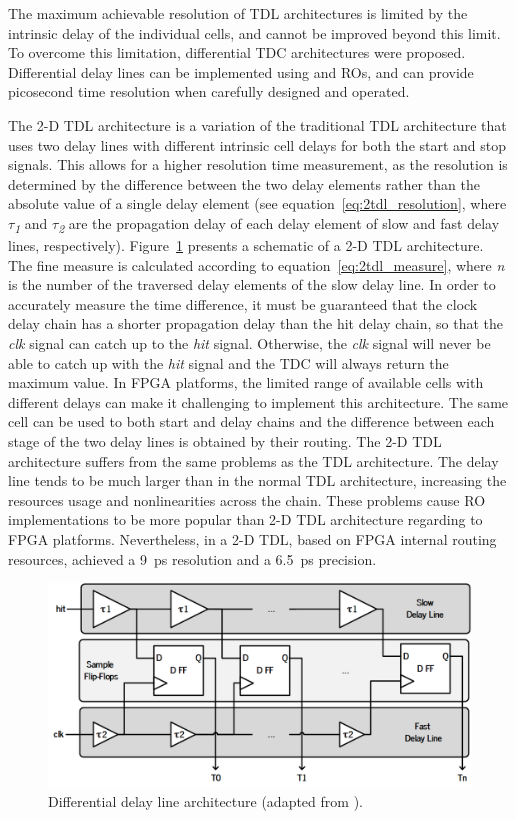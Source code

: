 The maximum achievable resolution of \gls{TDL} architectures is limited by the intrinsic delay of the individual cells, and cannot be improved beyond this limit. To overcome this limitation, differential \gls{TDC} architectures were proposed. Differential delay lines can be implemented using  and \glspl{RO}, and can provide picosecond time resolution when carefully designed and operated.

The 2-D \gls{TDL} architecture is a variation of the traditional \gls{TDL} architecture that uses two delay lines with different intrinsic cell delays for both the start and stop signals. This allows for a higher resolution time measurement, as the resolution is determined by the difference between the two delay elements rather than the absolute value of a single delay element (see equation~\ref{eq:2tdl_resolution}, where $\tau$\textit{\textsubscript{1}} and $\tau$\textit{\textsubscript{2}} are the propagation delay of each delay element of slow and fast delay lines, respectively). Figure~\ref{fig:2tdl} presents a schematic of a 2-D \gls{TDL} architecture. The fine measure is calculated according to equation~\ref{eq:2tdl_measure}, where \textit{n} is the number of the traversed delay elements of the slow delay line. In order to accurately measure the time difference, it must be guaranteed that the clock delay chain has a shorter propagation delay than the hit delay chain, so that the \textit{clk} signal can catch up to the \textit{hit} signal. Otherwise, the \textit{clk} signal will never be able to catch up with the \textit{hit} signal and the \gls{TDC} will always return the maximum value. In \gls{FPGA} platforms, the limited range of available cells with different delays can make it challenging to implement this architecture. The same cell can be used to both start and delay chains and the difference between each stage of the two delay lines is obtained by their routing. The 2-D \gls{TDL} architecture suffers from the same problems as the \gls{TDL} architecture. The delay line tends to be much larger than in the normal \gls{TDL} architecture, increasing the resources usage and nonlinearities across the chain. These problems cause \gls{RO} implementations to be more popular than 2-D \gls{TDL} architecture regarding to \gls{FPGA} platforms. Nevertheless, in \citep{2tdl_ex} a 2-D \gls{TDL}, based on \gls{FPGA} internal routing resources, achieved a 9~ps resolution and a 6.5~ps precision.

\begin{figure}[ht!]
	\centering
	\includegraphics[width=.7\textwidth]{img/02_StateofArt/2dtdl.png}
	\caption{Differential delay line architecture (adapted from \citep{2tdl_bd}).}
	\label{fig:2tdl}
\end{figure}

